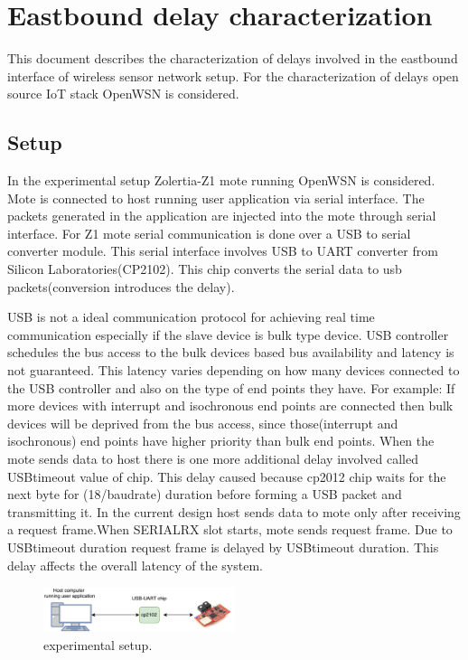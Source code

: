 \section{Eastbound delay characterization}
This document describes the characterization of delays involved in the eastbound interface of wireless sensor network setup. For the characterization of delays open source IoT stack OpenWSN is considered.

\subsection{Setup}
In the experimental setup Zolertia-Z1 mote running OpenWSN is considered.
Mote is connected to host running user application via serial interface.
The packets generated in the application are injected into the mote through serial interface.
For Z1 mote serial communication is done over a USB to serial converter module.
This serial interface involves USB to UART converter from Silicon Laboratories(CP2102).
This chip converts the serial data to usb packets(conversion introduces the delay).

USB is not a ideal communication protocol for achieving real time communication especially if the slave device is bulk type device.
USB controller schedules the bus access to the bulk devices based bus availability and latency is not guaranteed. This latency varies depending on how many devices connected to the USB controller and also on the type of end points they have.
For example: If more devices with interrupt and isochronous end points are connected then bulk devices will be deprived from the bus access, since those(interrupt and isochronous) end points have higher priority than bulk end points.
When the mote sends data to host there is one more additional delay involved called USBtimeout value of chip. This delay caused because cp2012 chip waits for the next byte for (18/baudrate) duration before forming a USB packet and transmitting it. In the current design host sends data to mote only after receiving a request frame.When SERIALRX slot starts, mote sends request frame. Due to USBtimeout duration request frame is delayed by USBtimeout duration.
This delay affects the overall latency of the system.
\begin{figure}[!h]
	\includegraphics[width=0.5\textwidth,center]{setup.pdf}
	\caption{experimental setup.}
	\label{fig:setup}
\end{figure}

